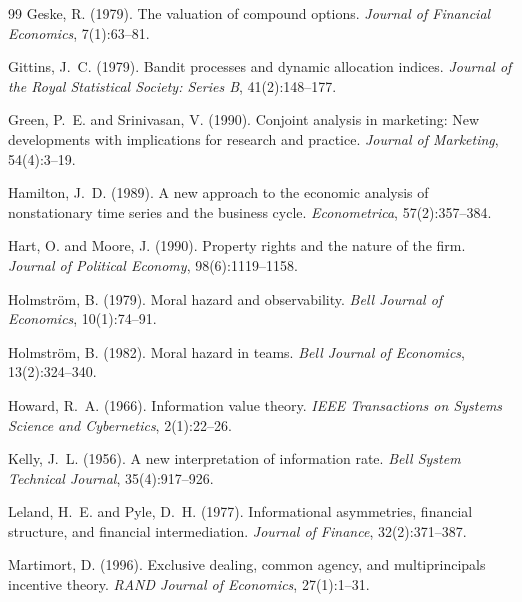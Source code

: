 \documentclass[12pt,a4paper,oneside]{book}
\theoremstyle{definition}
\theoremstyle{remark}
\begin{document}
\begin{thebibliography}{99}
Geske, R. (1979).
\newblock The valuation of compound options.
\newblock \textit{Journal of Financial Economics}, 7(1):63--81.

Gittins, J.~C. (1979).
\newblock Bandit processes and dynamic allocation indices.
\newblock \textit{Journal of the Royal Statistical Society: Series B}, 41(2):148--177.

Green, P.~E. and Srinivasan, V. (1990).
\newblock Conjoint analysis in marketing: New developments with implications for
  research and practice.
\newblock \textit{Journal of Marketing}, 54(4):3--19.

Hamilton, J.~D. (1989).
\newblock A new approach to the economic analysis of nonstationary time series
  and the business cycle.
\newblock \textit{Econometrica}, 57(2):357--384.

Hart, O. and Moore, J. (1990).
\newblock Property rights and the nature of the firm.
\newblock \textit{Journal of Political Economy}, 98(6):1119--1158.

Holmstr\"{o}m, B. (1979).
\newblock Moral hazard and observability.
\newblock \textit{Bell Journal of Economics}, 10(1):74--91.

Holmstr\"{o}m, B. (1982).
\newblock Moral hazard in teams.
\newblock \textit{Bell Journal of Economics}, 13(2):324--340.

Howard, R.~A. (1966).
\newblock Information value theory.
\newblock \textit{IEEE Transactions on Systems Science and Cybernetics}, 2(1):22--26.

Kelly, J.~L. (1956).
\newblock A new interpretation of information rate.
\newblock \textit{Bell System Technical Journal}, 35(4):917--926.

Leland, H.~E. and Pyle, D.~H. (1977).
\newblock Informational asymmetries, financial structure, and financial intermediation.
\newblock \textit{Journal of Finance}, 32(2):371--387.

Martimort, D. (1996).
\newblock Exclusive dealing, common agency, and multiprincipals incentive theory.
\newblock \textit{RAND Journal of Economics}, 27(1):1--31.


\end{thebibliography}
\end{document}
